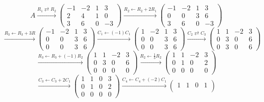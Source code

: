 \documentclass[12pt]{article}
\theoremstyle{plain}
\begin{document}
{	\[
		A \overset{R_1 \rightleftarrows R_2}{\longrightarrow}
		\begin{pmatrix}
			-1 & -2 & 1 & 3\\
			2 & 4 & 1 & 0\\
			3 & 6 & 0 & -3
		\end{pmatrix}
		\overset{R_2 \leftarrow R_2+2R_1} {\longrightarrow}
		\begin{pmatrix}
			-1 & -2 & 1 & 3\\
			0 & 0 & 3 & 6\\
			3 & 6 & 0 & -3
		\end{pmatrix}
	\]
	\[
		\overset{R_3 \leftarrow R_3 + 3R}{\longrightarrow}
		\begin{pmatrix}
			-1 & -2 & 1 & 3\\
			0 & 0 & 3 & 6 \\
			0 & 0 & 3 & 6 
		\end{pmatrix}
		\overset{C_1 \leftarrow (-1)C_1}{\longrightarrow}
		\begin{pmatrix}
			1 & -2 & 1 & 3\\
			0 & 0 & 3 & 6\\
			0 & 0 & 3 & 6
		\end{pmatrix}
		\overset{C_2 \rightleftarrows C_3}{\longrightarrow}
		\begin{pmatrix}
			1 & 1 & -2 & 3\\
			0 & 3 & 0 & 6\\
			0 & 3 & 0 & 6
		\end{pmatrix}
	\]
	\[
		\overset{R_3 \leftarrow R_3 + (-1)R_2}{\longrightarrow}
		\begin{pmatrix}
			1 & 1 & -2 & 3\\
			0 & 3 & 0 & 6 \\
			0 & 0 & 0 & 0
		\end{pmatrix}
		\overset{R_2 \leftarrow \frac 13 R_2}{\longrightarrow}
		\begin{pmatrix}
			1 & 1 & -2 & 3\\
			0 & 1 & 0 & 2\\
			0 & 0 & 0 & 0
		\end{pmatrix}
	\]
	\[
		\overset{C_3 \leftarrow C_3 + 2C_1}{\longrightarrow}
		\begin{pmatrix}
			1 & 1 & 0 & 3\\
			0 & 1 & 0 & 2\\
			0 & 0 & 0 & 0
		\end{pmatrix}
		\overset{C_4 \leftarrow C_4 + (-2)C_1}{\longrightarrow}
		\begin{pmatrix}
			1 & 1 & 0 & 1\\

\end{pmatrix}\]}
\end{document}
